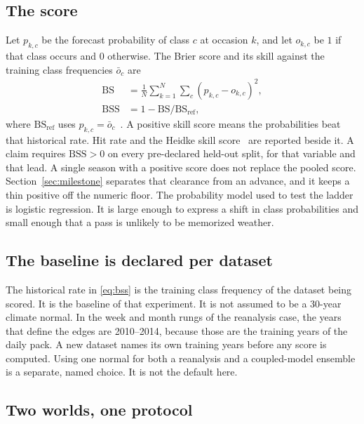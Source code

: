 \documentclass{ametsocV6.2}
\begin{document}
\subsection{The score}
\label{sec:score}

Let $p_{k,c}$ be the forecast probability of class $c$ at occasion $k$, and let $o_{k,c}$ be $1$ if that class occurs and $0$ otherwise.
The Brier score and its skill against the training class frequencies $\bar{o}_c$ are
\begin{equation}
\begin{aligned}
\mathrm{BS} &= \frac{1}{N}\sum_{k=1}^{N}\sum_{c}(p_{k,c}-o_{k,c})^{2},\\
\mathrm{BSS} &= 1 - \mathrm{BS}/\mathrm{BS}_{\mathrm{ref}},
\end{aligned}
\label{eq:bss}
\end{equation}
where $\mathrm{BS}_{\mathrm{ref}}$ uses $p_{k,c}=\bar{o}_c$~\citep{brier1950,wilks2011}.
A positive skill score means the probabilities beat that historical rate.
Hit rate and the Heidke skill score~\citep{heidke1926} are reported beside it.
A claim requires $\mathrm{BSS}>0$ on every pre-declared held-out split, for that variable and that lead.
A single season with a positive score does not replace the pooled score.
Section~\ref{sec:milestone} separates that clearance from an advance, and it keeps a thin positive off the numeric floor.
The probability model used to test the ladder is logistic regression.
It is large enough to express a shift in class probabilities and small enough that a pass is unlikely to be memorized weather.

\subsection{The baseline is declared per dataset}
\label{sec:baseline}

The historical rate in \eqref{eq:bss} is the training class frequency of the dataset being scored.
It is the baseline of that experiment.
It is not assumed to be a 30-year climate normal.
In the week and month rungs of the reanalysis case, the years that define the edges are 2010--2014, because those are the training years of the daily pack.
A new dataset names its own training years before any score is computed.
Using one normal for both a reanalysis and a coupled-model ensemble is a separate, named choice.
It is not the default here.

\subsection{Two worlds, one protocol}
\label{sec:worlds}
\end{document}
